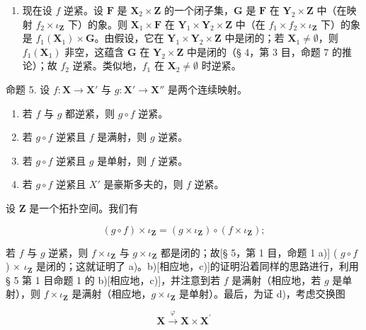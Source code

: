 \begin{enumerate}
\def\labelenumi{\alph{enumi})}
\setcounter{enumi}{1}
\tightlist
\item
  现在设 \(f\) 逆紧。设 \(\mathbf{F}\) 是 \(\mathbf{X}_2 \times \mathbf{Z}\) 的一个闭子集，\(\mathbf{G}\) 是 \(\mathbf{F}\) 在 \(\mathbf{Y}_2 \times \mathbf{Z}\) 中（在映射 \(f_2 \times \iota_{\mathbf{Z}}\) 下）的象。则 \(\mathbf{X}_1 \times \mathbf{F}\) 在 \(\mathbf{Y}_1 \times \mathbf{Y}_2 \times \mathbf{Z}\) 中（在 \(f_1 \times f_2 \times \iota_{\mathbf{Z}}\) 下）的象是 \(f_1(\mathbf{X}_1) \times \mathbf{G}\)。由假设，它在 \(\mathbf{Y}_1 \times \mathbf{Y}_2 \times \mathbf{Z}\) 中是闭的；若 \(\mathbf{X}_1 \neq \emptyset\)，则 \(f_1(\mathbf{X}_1)\) 非空，这蕴含 \(\mathbf{G}\) 在 \(\mathbf{Y}_2 \times \mathbf{Z}\) 中是闭的（§ 4，第 3 目，命题 7 的推论）；故 \(f_2\) 逆紧。类似地，\(f_1\) 在 \(\mathbf{X}_2 \neq \emptyset\) 时逆紧。
\end{enumerate}

命题 5. 设 \(f: \mathbf{X} \to \mathbf{X}'\) 与 \(g: \mathbf{X}' \to \mathbf{X}''\) 是两个连续映射。

\begin{enumerate}
\def\labelenumi{\alph{enumi})}
\item
  若 \(f\) 与 \(g\) 都逆紧，则 \(g \circ f\) 逆紧。
\item
  若 \(g \circ f\) 逆紧且 \(f\) 是满射，则 \(g\) 逆紧。
\item
  若 \(g \circ f\) 逆紧且 \(g\) 是单射，则 \(f\) 逆紧。
\item
  若 \(g \circ f\) 逆紧且 \(X'\) 是豪斯多夫的，则 \(f\) 逆紧。
\end{enumerate}

设 \(\mathbf{Z}\) 是一个拓扑空间。我们有

\[
(g \circ f) \times \iota_ {\mathbf {Z}} = (g \times \iota_ {\mathbf {Z}}) \circ (f \times \iota_ {\mathbf {Z}});
\]

若 \(f\) 与 \(g\) 逆紧，则 \(f \times \iota_{\mathbf{Z}}\) 与 \(g \times \iota_{\mathbf{Z}}\) 都是闭的；故{[}§ 5，第 1 目，命题 1 a){]} ( \(g \circ f\) ) × \(\iota_{\mathbf{Z}}\) 是闭的；这就证明了 a)。b){[}相应地，c){]}的证明沿着同样的思路进行，利用 § 5 第 1 目命题 1 的 b){[}相应地，c){]}，并注意到若 \(f\) 是满射（相应地，若 \(g\) 是单射），则 \(f \times \iota_{\mathbf{Z}}\) 是满射（相应地，\(g \times \iota_{\mathbf{Z}}\) 是单射）。最后，为证 d)，考虑交换图

\[
\mathbf {X} \stackrel {\varphi} {\rightarrow} \mathbf {X} \times \mathbf {X} ^ {\prime}\tag{1}
\]

